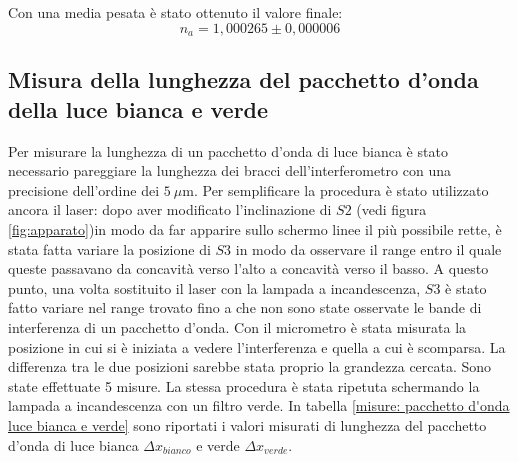 \documentclass{article}
\begin{document}
        Con una media pesata è stato ottenuto il valore finale:
            \[n_a = 1,000265 \pm 0,000006\]
            
\subsection{Misura della lunghezza del pacchetto d'onda della luce bianca e verde}
    Per misurare la lunghezza di un pacchetto d'onda di luce bianca è stato necessario pareggiare la lunghezza dei bracci dell'interferometro con una precisione dell'ordine dei $5\ \mu$m. Per semplificare la procedura è stato utilizzato ancora il laser: dopo aver modificato l'inclinazione di $S2$ (vedi figura \ref{fig:apparato})in modo da far apparire sullo schermo linee il più possibile rette, è stata fatta variare la posizione di $S3$ in modo da osservare il range entro il quale queste passavano da concavità verso l'alto a concavità verso il basso. A questo punto, una volta sostituito il laser con la lampada a incandescenza, $S3$ è stato fatto variare nel range trovato fino a che non sono state osservate le bande di interferenza di un pacchetto d'onda. Con il micrometro è stata misurata la posizione in cui si è iniziata a vedere l'interferenza e quella a cui è scomparsa. La differenza tra le due posizioni sarebbe stata proprio la grandezza cercata. Sono state effettuate 5 misure.
    La stessa procedura è stata ripetuta schermando la lampada a incandescenza con un filtro verde. In tabella \ref{misure: pacchetto d'onda luce bianca e verde} sono riportati i valori misurati di lunghezza del pacchetto d'onda di luce bianca $\Delta x_{bianco}$ e verde $\Delta x_{verde}$.
\end{document}
